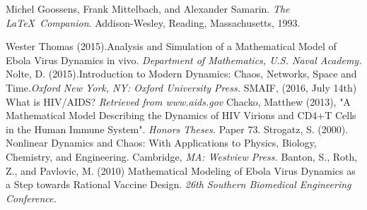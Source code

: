 \documentclass{article}
\begin{document}
\begin{thebibliography}{9}
Michel Goossens, Frank Mittelbach, and Alexander Samarin. 
\textit{The \LaTeX\ Companion}. 
Addison-Wesley, Reading, Massachusetts, 1993.

Wester Thomas (2015).Analysis and Simulation of a Mathematical Model of Ebola Virus Dynamics in vivo. \textit{Department of Mathematics, U.S. Naval Academy.}
Nolte, D. (2015).Introduction to Modern Dynamics: Chaos, Networks, Space and Time.\textit{Oxford New York, NY: Oxford University Press.}
SMAIF, (2016, July 14th) What is HIV/AIDS? \textit{Retrieved from www.aids.gov}
Chacko, Matthew (2013), "A Mathematical Model Describing the Dynamics of HIV Virions and CD4+T Cells in the Human Immune System".\textit{ Honors Theses.} Paper 73.
Strogatz, S. (2000). Nonlinear Dynamics and Chaos: With Applications to Physics, Biology, Chemistry, and Engineering. Cambridge, \textit{MA: Westview Press.}
Banton, S., Roth, Z., and Pavlovic, M. (2010) Mathematical Modeling of Ebola Virus Dynamics as a Step towards Rational Vaccine Design. \textit{26th Southern Biomedical Engineering Conference.}
\end{thebibliography}
\end{document}
